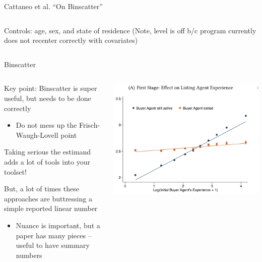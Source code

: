 \documentclass[notes,11pt, aspectratio=169]{beamer}
\newenvironment{wideitemize}{\itemize\addtolength{\itemsep}{10pt}}{\enditemize}
\begin{document}
\begin{frame}{Cattaneo et al. ``On Binscatter''}
\begin{columns}[T]
\begin{column}{.5\textwidth}
{      Controls: age, sex, and state of residence
      (Note, level is off b/c program currently does not recenter correctly with covariates)
      }
  \end{column}
\end{columns}
\end{frame}


\begin{frame}{Binscatter}
  \begin{columns}[T] %
    \begin{column}{.5\textwidth}
      \begin{wideitemize}
      \item Key point: Binscatter is super useful, but needs to be done correctly
        \begin{itemize}
        \item Do not mess up the Frisch-Waugh-Lovell point
        \end{itemize}
      \item Taking serious the estimand adds a lot of tools into your toolset!
      \item But, a lot of times these approaches are buttressing a
        simple reported linear number
        \begin{itemize}
        \item Nuance is important, but a paper has many pieces --
          useful to have summary numbers
        \end{itemize}
  \end{wideitemize}
  \end{column}%
  \hfill%
  \begin{column}{.5\textwidth}
      \includegraphics[width=\linewidth]{agent_binscatter.png}
  \end{column}
\end{columns}
\end{frame}
\end{document}
